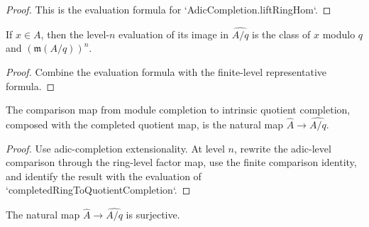 \begin{proof}
  This is the evaluation formula for `AdicCompletion.liftRingHom`.
\end{proof}

\begin{lemma}
  \label{lem:completed_ring_to_quotient_completion_of_eval}
  If \(x\in A\), then the level-\(n\) evaluation of its image in
  \(\widehat{A/q}\) is the class of \(x\) modulo \(q\) and
  \((\mathfrak m(A/q))^n\).
\end{lemma}

\begin{proof}
  Combine the evaluation formula with the finite-level representative formula.
\end{proof}

\begin{lemma}
  \label{lem:quotient_module_completion_to_quotient_adic_completion_comp_map}
  The comparison map from module completion to intrinsic quotient completion,
  composed with the completed quotient map, is the natural map
  \(\widehat A\to\widehat{A/q}\).
\end{lemma}

\begin{proof}
  Use adic-completion extensionality.  At level \(n\), rewrite the adic-level
  comparison through the ring-level factor map, use the finite comparison
  identity, and identify the result with the evaluation of
  `completedRingToQuotientCompletion`.
\end{proof}

\begin{lemma}
  \label{lem:completed_ring_to_quotient_completion_surjective}
  The natural map \(\widehat A\to\widehat{A/q}\) is surjective.
\end{lemma}

